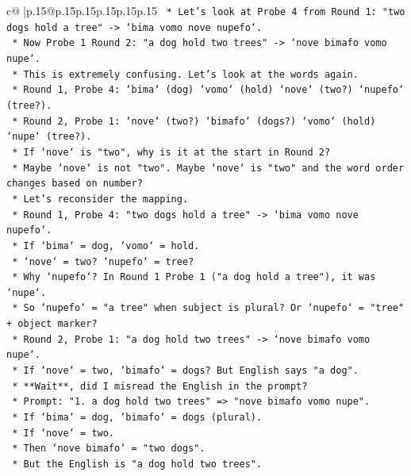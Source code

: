 \documentclass{article}
\begin{document}
{\begin{supertabular}{c@{$\;$}|p{.15\linewidth}@{}p{.15\linewidth}p{.15\linewidth}p{.15\linewidth}p{.15\linewidth}p{.15\linewidth}}
{{{\texttt{        *   Let's look at Probe 4 from Round 1: "two dogs hold a tree" {-}> `bima vomo nove nupefo`.} \\
\texttt{        *   Now Probe 1 Round 2: "a dog hold two trees" {-}> `nove bimafo vomo nupe`.} \\
\texttt{        *   This is extremely confusing. Let's look at the words again.} \\
\texttt{        *   Round 1, Probe 4: `bima` (dog) `vomo` (hold) `nove` (two?) `nupefo` (tree?).} \\
\texttt{        *   Round 2, Probe 1: `nove` (two?) `bimafo` (dogs?) `vomo` (hold) `nupe` (tree?).} \\
\texttt{        *   If `nove` is "two", why is it at the start in Round 2?} \\
\texttt{        *   Maybe `nove` is not "two". Maybe `nove` is "two" and the word order changes based on number?} \\
\texttt{        *   Let's reconsider the mapping.} \\
\texttt{        *   Round 1, Probe 4: "two dogs hold a tree" {-}> `bima vomo nove nupefo`.} \\
\texttt{            *   If `bima` = dog, `vomo` = hold.} \\
\texttt{            *   `nove` = two? `nupefo` = tree?} \\
\texttt{            *   Why `nupefo`? In Round 1 Probe 1 ("a dog hold a tree"), it was `nupe`.} \\
\texttt{            *   So `nupefo` = "a tree" when subject is plural? Or `nupefo` = "tree" + object marker?} \\
\texttt{        *   Round 2, Probe 1: "a dog hold two trees" {-}> `nove bimafo vomo nupe`.} \\
\texttt{            *   If `nove` = two, `bimafo` = dogs? But English says "a dog".} \\
\texttt{            *   **Wait**, did I misread the English in the prompt?} \\
\texttt{            *   Prompt: "1. a dog hold two trees" => "nove bimafo vomo nupe".} \\
\texttt{            *   If `bima` = dog, `bimafo` = dogs (plural).} \\
\texttt{            *   If `nove` = two.} \\
\texttt{            *   Then `nove bimafo` = "two dogs".} \\
\texttt{            *   But the English is "a dog hold two trees".} \\
}}}
\end{supertabular}}
\end{document}
